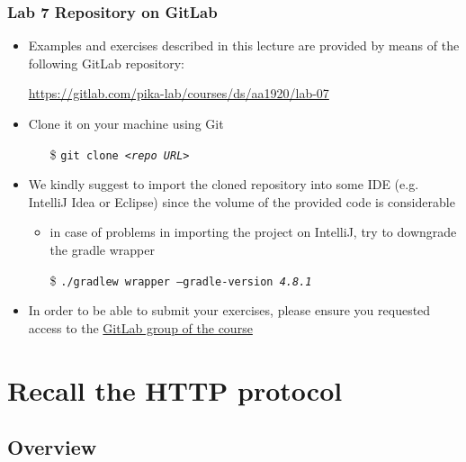 \documentclass[presentation]{beamer}\mode<presentation>{\usetheme{AMSCesenaPurpleAndGold}}
\begin{document}
\begin{frame}
\frametitle{Lab 7 Repository on GitLab}

	\begin{itemize}
		\item Examples and exercises described in this lecture are provided by means of the following GitLab repository:
		\begin{center}
			\url{https://gitlab.com/pika-lab/courses/ds/aa1920/lab-07}
		\end{center}
		
		\vfill
		
		\item Clone it on your machine using Git
		\begin{itemize}
		    \item[\$] \texttt{git clone \textit{<repo URL>}}
		\end{itemize}
		
		\vfill
		
		\item We kindly suggest to import the cloned repository into some IDE (e.g. IntelliJ Idea or Eclipse) since the volume of the provided code is considerable
		\begin{itemize}
		    \item in case of problems in importing the project on IntelliJ, try to downgrade the gradle wrapper
		    \item[\$] \texttt{./gradlew wrapper \alert{--gradle-version \textit{4.8.1}}}
		\end{itemize}
		
		\vfill
		
		\item In order to be able to submit your exercises, please ensure you requested access to the \href{https://gitlab.com/pika-lab/courses/ds/aa1920}{GitLab group of the course}
	\end{itemize}

\end{frame}


\section{Recall the HTTP protocol}

\subsection{Overview}
\end{document}
